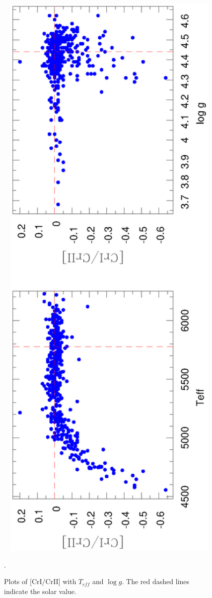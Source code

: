 \documentclass[dvips,12pt,a4paper]{report}
\begin{document}
{{\begin{figure}[h]
\centering
\includegraphics[angle=-90, trim=5mm 0mm 100mm 10mm, clip, width=12cm]{pics/parte3/CrICrII.eps}
\caption[Plots of CrI/CrII]{Plots of [CrI/CrII] with $T_{eff}$ and $\log g$. The red dashed lines indicate the solar value.}.
\label{cr2cr1}
\end{figure}

}}
\end{document}
